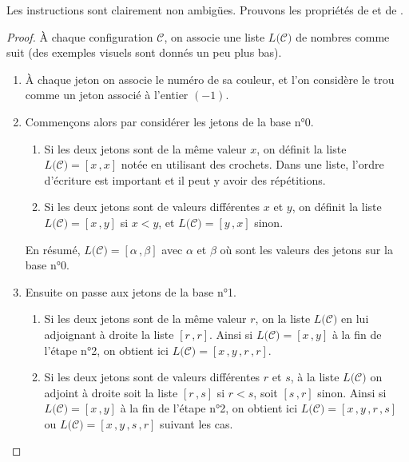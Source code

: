 \bigskip

Les instructions sont clairement non ambigües. Prouvons les propriétés de  et de .

\begin{proof}
    À chaque configuration $\mathscr{C}$, on associe une liste $L({\mathscr{C})}$ de nombres comme suit (des exemples visuels sont donnés un peu plus bas).

    \begin{enumerate}
        \item À chaque jeton on associe le numéro de sa couleur, et l'on considère le trou comme un jeton associé à l'entier $(-1)$.

        \item Commençons alors par considérer les jetons de la base n°0.

        \begin{enumerate}
            \item Si les deux jetons sont de la même valeur $x$, on définit la liste $L({\mathscr{C})} = [x \, , x]$ notée en utilisant des crochets. Dans une liste, l'ordre d'écriture est important et il peut y avoir des répétitions.

            \item Si les deux jetons sont de valeurs différentes $x$ et $y$, on définit la liste $L({\mathscr{C})} = [x \, , y]$ si $x < y$, et $L({\mathscr{C})} = [y \, , x]$ sinon.
        \end{enumerate}

        En résumé, $L({\mathscr{C})} = [\alpha \, , \beta]$ avec $\alpha$ et $\beta$ où sont les valeurs des jetons sur la base n°0.

        \item Ensuite on passe aux jetons de la base n°1.

        \begin{enumerate}
            \item Si les deux jetons sont de la même valeur $r$, on  la liste $L({\mathscr{C})}$ en lui adjoignant à droite la liste $[r \, , r]$. Ainsi si $L({\mathscr{C})} = [x \, , y]$ à la fin de l'étape n°2, on obtient ici $L({\mathscr{C})} = [x \, , y \, , r \, , r]$.

            \item Si les deux jetons sont de valeurs différentes $r$ et $s$, à la liste $L({\mathscr{C})}$ on adjoint à droite soit la liste $[r \, , s]$ si $r < s$, soit $[s \, , r]$ sinon. Ainsi si $L({\mathscr{C})} = [x \, , y]$ à la fin de l'étape n°2, on obtient ici $L({\mathscr{C})} = [x \, , y \, , r \, , s]$ ou $L({\mathscr{C})} = [x \, , y \, , s \, , r]$ suivant les cas.
        \end{enumerate}


\end{enumerate}
\end{proof}
